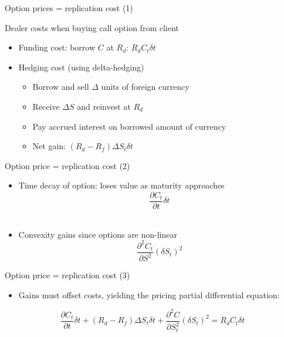 \documentclass[ignorenonframetext,aspectratio=169]{beamer}
\providecommand{\tightlist}{%
  \setlength{\itemsep}{0pt}\setlength{\parskip}{0pt}}
\begin{document}
\begin{frame}{Option prices = replication cost (1)}

Dealer costs when buying call option from client

\begin{itemize}
\tightlist
\item
  Funding cost: borrow \(C\) at \(R_d\): \(R_d C_t \delta t\)\\
\item
  Hedging cost (using delta-hedging)

  \begin{itemize}
  \tightlist
  \item
    Borrow and sell \(\Delta\) units of foreign currency
  \item
    Receive \(\Delta S\) and reinvest at \(R_d\)
  \item
    Pay accrued interest on borrowed amount of currency
  \item
    Net gain: \((R_d - R_f)\Delta S_t \delta t\)
  \end{itemize}
\end{itemize}

\end{frame}

\begin{frame}{Option price = replication cost (2)}

\begin{itemize}
\tightlist
\item
  Time decay of option: loses value as maturity approaches
  \[\frac{\partial C_t}{\partial t} \delta t\]\\
  \hspace*{0.333em}
\item
  Convexity gains since options are non-linear
  \[ \frac{\partial^2 C_t}{\partial S^2}(\delta S_t)^2\]
\end{itemize}

\end{frame}

\begin{frame}{Option price = replication cost (3)}

\begin{itemize}
\tightlist
\item
  Gains must offset costs, yielding the pricing partial differential
  equation:
\end{itemize}

\[
\frac{\partial C_t}{\partial t} \delta t + (R_d - R_f) \Delta S_t  \delta t + \frac{\partial^2 C}{\partial S_t^2} (\delta S_t)^2 = R_d C_t \delta t
\]

\end{frame}
\end{document}
